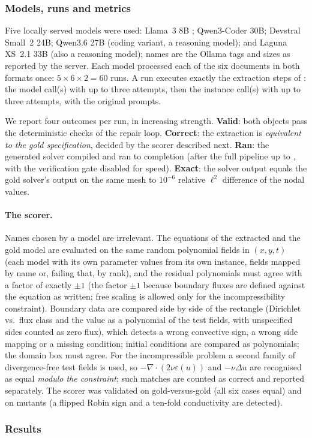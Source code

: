 \subsubsection{Models, runs and metrics}
Five locally served models were used: Llama~3 8B \citep{llama3}; Qwen3-Coder 30B; Devstral Small~2 24B; Qwen3.6 27B (coding variant, a reasoning model); and Laguna XS~2.1 33B (also a reasoning model); names are the Ollama tags and sizes as reported by the server. Each model processed each of the six documents in both formats once: $5\times6\times2=60$ runs. A run executes exactly the extraction steps of : the model call(s) with up to three attempts, then the instance call(s) with up to three attempts, with the original prompts.

We report four outcomes per run, in increasing strength. \textbf{Valid}: both objects pass the deterministic checks of the repair loop. \textbf{Correct}: the extraction is \emph{equivalent to the gold specification}, decided by the scorer described next. \textbf{Ran}: the generated solver compiled and ran to completion (after the full pipeline up to , with the verification gate disabled for speed). \textbf{Exact}: the solver output equals the gold solver's output on the same mesh to $10^{-6}$ relative $\ell^2$ difference of the nodal values.

\paragraph{The scorer.} Names chosen by a model are irrelevant. The equations of the extracted and the gold model are evaluated on the same random polynomial fields in $(x,y,t)$ (each model with its own parameter values from its own instance, fields mapped by name or, failing that, by rank), and the residual polynomials must agree with a factor of exactly $\pm1$ (the factor $\pm1$ because boundary fluxes are defined against the equation as written; free scaling is allowed only for the incompressibility constraint). Boundary data are compared side by side of the rectangle (Dirichlet vs.\ flux class and the value as a polynomial of the test fields, with unspecified sides counted as zero flux), which detects a wrong convective sign, a wrong side mapping or a missing condition; initial conditions are compared as polynomials; the domain box must agree. For the incompressible problem a second family of divergence-free test fields is used, so $-\nabla\cdot(2\nu\varepsilon(u))$ and $-\nu\Delta u$ are recognised as equal \emph{modulo the constraint}; such matches are counted as correct and reported separately. The scorer was validated on gold-versus-gold (all six cases equal) and on mutants (a flipped Robin sign and a ten-fold conductivity are detected).

\subsubsection{Results}

